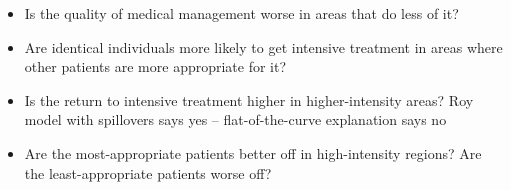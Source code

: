\documentclass[blue]{beamer}
\begin{document}
{{\begin{small}
\begin{itemize}
\begin{itemize}
\item {\small Is the quality of medical management worse in areas that do
less of it? \medskip{}
}{\small\par}
\item {\small Are identical individuals more likely to get intensive treatment
in areas where other patients are more appropriate for it? \medskip{}
}{\small\par}
\item {\small Is the return to intensive treatment higher in higher-intensity
areas? Roy model with spillovers says yes -- flat-of-the-curve explanation
says no \medskip{}
}{\small\par}
\item {\small Are the most-appropriate patients better off in high-intensity
regions? Are the least-appropriate patients worse off? }{\small\par}
\end{itemize}
\end{itemize}
\end{small} 

}

{ 
}

{  
}

{  
}

}
\end{document}
